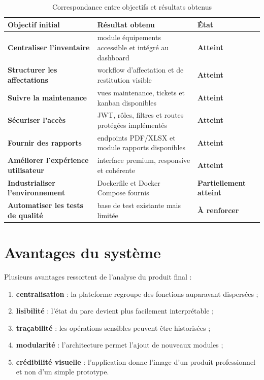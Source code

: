 ﻿\documentclass[12pt,a4paper,oneside]{report}
\begin{document}
\begin{table}[H]
\centering
\caption{Correspondance entre objectifs et résultats obtenus}
\label{tab:resultats-objectifs}
\begin{tabularx}{\textwidth}{>{\bfseries}p{4.6cm}X>{\bfseries}p{2cm}}
\toprule
Objectif initial & Résultat obtenu & État \\
\midrule
Centraliser l'inventaire & module équipements accessible et intégré au dashboard & Atteint \\
Structurer les affectations & workflow d'affectation et de restitution visible & Atteint \\
Suivre la maintenance & vues maintenance, tickets et kanban disponibles & Atteint \\
Sécuriser l'accès & JWT, rôles, filtres et routes protégées implémentés & Atteint \\
Fournir des rapports & endpoints PDF/XLSX et module rapports disponibles & Atteint \\
Améliorer l'expérience utilisateur & interface premium, responsive et cohérente & Atteint \\
Industrialiser l'environnement & Dockerfile et Docker Compose fournis & Partiellement atteint \\
Automatiser les tests de qualité & base de test existante mais limitée & À renforcer \\
\bottomrule
\end{tabularx}
\end{table}

\section{Avantages du système}
Plusieurs avantages ressortent de l'analyse du produit final :
\begin{enumerate}
  \item \textbf{centralisation} : la plateforme regroupe des fonctions auparavant dispersées ;
  \item \textbf{lisibilité} : l'état du parc devient plus facilement interprétable ;
  \item \textbf{traçabilité} : les opérations sensibles peuvent être historisées ;
  \item \textbf{modularité} : l'architecture permet l'ajout de nouveaux modules ;
  \item \textbf{crédibilité visuelle} : l'application donne l'image d'un produit professionnel et non d'un simple prototype.
\end{enumerate}
\end{document}
